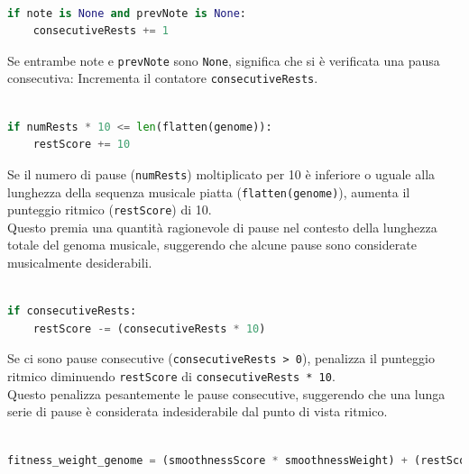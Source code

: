 \documentclass[a4paper,12pt]{report}
\begin{document}
\begin{lstlisting}[language=Python]

if note is None and prevNote is None:
    consecutiveRests += 1

\end{lstlisting}

Se entrambe note e \texttt{prevNote} sono \texttt{None}, significa che si è verificata una pausa consecutiva: Incrementa il contatore \texttt{consecutiveRests}.

\begin{lstlisting}[language=Python]

if numRests * 10 <= len(flatten(genome)):
    restScore += 10

\end{lstlisting}

Se il numero di pause (\texttt{numRests}) moltiplicato per 10 è inferiore o uguale alla lunghezza della sequenza musicale piatta (\texttt{flatten(genome)}), aumenta il punteggio ritmico (\texttt{restScore}) di 10. \\
Questo premia una quantità ragionevole di pause nel contesto della lunghezza totale del genoma musicale, suggerendo che alcune pause sono considerate musicalmente desiderabili.

\begin{lstlisting}[language=Python]

if consecutiveRests:
    restScore -= (consecutiveRests * 10)

\end{lstlisting}

Se ci sono pause consecutive (\texttt{consecutiveRests > 0}), penalizza il punteggio ritmico diminuendo \texttt{restScore} di \texttt{consecutiveRests * 10}. \\
Questo penalizza pesantemente le pause consecutive, suggerendo che una lunga serie di pause è considerata indesiderabile dal punto di vista ritmico.

\begin{lstlisting}[language=Python]

fitness_weight_genome = (smoothnessScore * smoothnessWeight) + (restScore * restWeight) + (harmonyScore * harmonyWeight)

\end{lstlisting}
\end{document}
